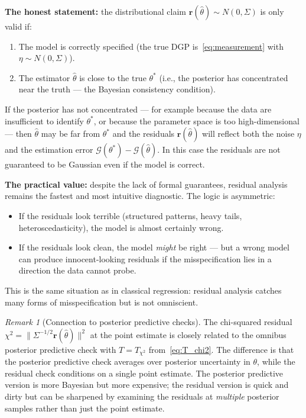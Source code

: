 \documentclass[11pt]{article}
\newcommand{\cG}{\mathcal{G}}
\theoremstyle{plain}
\theoremstyle{remark}
\newtheorem{remark}{Remark}
\theoremstyle{definition}
\begin{document}
\textbf{The honest statement:} the distributional claim 
$\mathbf{r}(\hat\theta) \sim N(0, \Sigma)$ is only valid if:
\begin{enumerate}[label=(\roman*)]
\item The model is correctly specified (the true DGP is~\eqref{eq:measurement} 
  with $\eta \sim N(0, \Sigma)$).
\item The estimator $\hat\theta$ is close to the true $\theta^*$ (i.e., the 
  posterior has concentrated near the truth --- the Bayesian consistency 
  condition).
\end{enumerate}
If the posterior has not concentrated --- for example because the data are 
insufficient to identify $\theta^*$, or because the parameter space is 
too high-dimensional --- then $\hat\theta$ may be far from $\theta^*$ and 
the residuals $\mathbf{r}(\hat\theta)$ will reflect both the noise $\eta$ 
and the estimation error $\cG(\theta^*) - \cG(\hat\theta)$. In this case 
the residuals are not guaranteed to be Gaussian even if the model is correct.

\textbf{The practical value:} despite the lack of formal guarantees, residual 
analysis remains the fastest and most intuitive diagnostic. The logic is 
asymmetric:
\begin{itemize}
\item If the residuals look terrible (structured patterns, heavy tails, 
  heteroscedasticity), the model is almost certainly wrong.
\item If the residuals look clean, the model \emph{might} be right --- but 
  a wrong model can produce innocent-looking residuals if the misspecification 
  lies in a direction the data cannot probe.
\end{itemize}
This is the same situation as in classical regression: residual analysis 
catches many forms of misspecification but is not omniscient.

\begin{remark}[Connection to posterior predictive checks]
The chi-squared residual $\chi^2 = \|\Sigma^{-1/2}\mathbf{r}(\hat\theta)\|^2$ 
at the point estimate is closely related to the omnibus posterior predictive 
check with $T = T_{\chi^2}$ from~\eqref{eq:T_chi2}. The difference is that 
the posterior predictive check averages over posterior uncertainty in $\theta$, 
while the residual check conditions on a single point estimate. The posterior 
predictive version is more Bayesian but more expensive; the residual version 
is quick and dirty but can be sharpened by examining the residuals at 
\emph{multiple} posterior samples rather than just the point estimate.
\end{remark}
\end{document}
